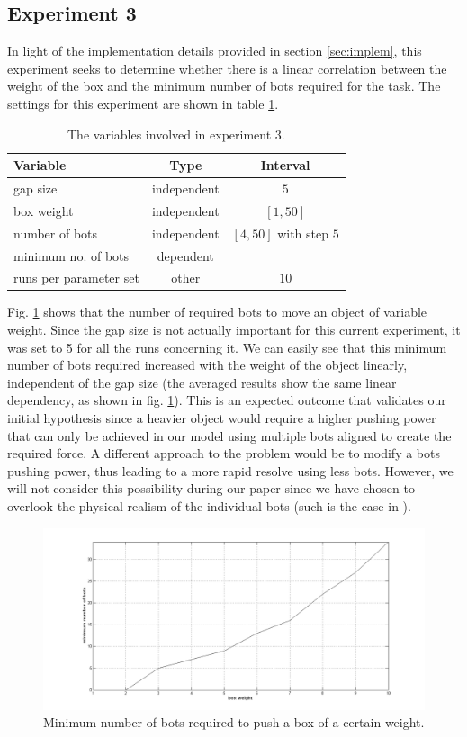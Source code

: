 \subsection{Experiment 3}
\label{ssec:exp3}

In light of the implementation details provided in section \ref{sec:implem}, this experiment seeks to determine whether there is a linear correlation between the weight of the box and the minimum number of bots required for the task. The settings for this experiment are shown in table \ref{tbl:exp3}.

\begin{table}
 \caption{The variables involved in experiment 3.}
 \begin{center}
  \begin{tabular}{| p{5cm} | c | c |}
   \hline
   \centering \textbf{Variable} & \textbf{Type} & \textbf{Interval} \\ \hline
   gap size & independent & $5$ \\ \hline
   box weight & independent & $[1, 50]$ \\ \hline
   number of bots & independent & $[4, 50]$ with step $5$ \\ \hline
   minimum no. of bots & dependent &  \\ \hline
   runs per parameter set & other & $10$ \\ \hline
  \end{tabular}
 \end{center}
 \label{tbl:exp3}
\end{table}

Fig. \ref{fig:minbots} shows that the number of required bots to move an object of variable weight. Since the gap size is not actually important for this current experiment, it was set to 5 for all the runs concerning it. We can easily see that this minimum number of bots required increased with the weight of the object linearly, independent of the gap size (the averaged results show the same linear dependency, as shown in fig. \ref{fig:minbots}). This is an expected outcome that validates our initial hypothesis since a heavier object would require a higher pushing power that can only be achieved in our model using multiple bots aligned to create the required force. A different approach to the problem would be to modify a bots pushing power, thus leading to a more rapid resolve using less bots. However, we will not consider this possibility during our paper since we have chosen to overlook the physical realism of the individual bots (such is the case in \cite{Yun:2011:OSA:2036628.2036638}).

\begin{figure}[t]
\centerline{\includegraphics[scale=0.4]{images/minimum_no_bots2}}
\caption{Minimum number of bots required to push a box of a certain weight.}
\label{fig:minbots}
\end{figure}

